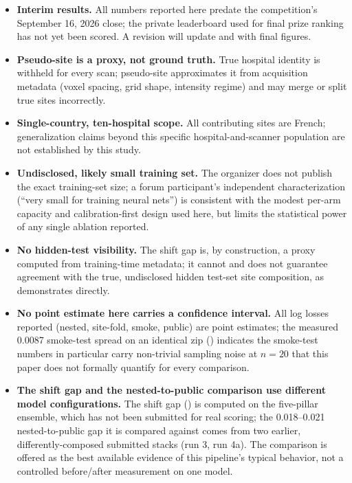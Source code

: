 \documentclass[10pt]{article}
\begin{document}
\begin{itemize}[leftmargin=*]
\item \textbf{Interim results.} All numbers reported here predate the competition's September 16, 2026 close; the private leaderboard used for final prize ranking has not yet been scored. A revision will update  and  with final figures.
\item \textbf{Pseudo-site is a proxy, not ground truth.} True hospital identity is withheld for every scan; pseudo-site approximates it from acquisition metadata (voxel spacing, grid shape, intensity regime) and may merge or split true sites incorrectly.
\item \textbf{Single-country, ten-hospital scope.} All contributing sites are French; generalization claims beyond this specific hospital-and-scanner population are not established by this study.
\item \textbf{Undisclosed, likely small training set.} The organizer does not publish the exact training-set size; a forum participant's independent characterization (``very small for training neural nets'') is consistent with the modest per-arm capacity and calibration-first design used here, but limits the statistical power of any single ablation reported.
\item \textbf{No hidden-test visibility.} The shift gap is, by construction, a proxy computed from training-time metadata; it cannot and does not guarantee agreement with the true, undisclosed hidden test-set site composition, as  demonstrates directly.
\item \textbf{No point estimate here carries a confidence interval.} All log losses reported (nested, site-fold, smoke, public) are point estimates; the measured 0.0087 smoke-test spread on an identical zip () indicates the smoke-test numbers in particular carry non-trivial sampling noise at $n=20$ that this paper does not formally quantify for every comparison.
\item \textbf{The shift gap and the nested-to-public comparison use different model configurations.} The shift gap () is computed on the five-pillar ensemble, which has not been submitted for real scoring; the 0.018--0.021 nested-to-public gap it is compared against comes from two earlier, differently-composed submitted stacks (run 3, run 4a). The comparison is offered as the best available evidence of this pipeline's typical behavior, not a controlled before/after measurement on one model.
\end{itemize}
\end{document}
